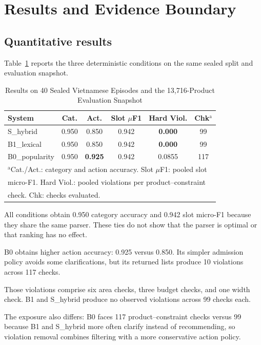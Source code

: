 \documentclass[conference,a4paper]{IEEEtran}
\begin{document}
\section{Results and Evidence Boundary}
\subsection{Quantitative results}
Table~\ref{tab1} reports the three deterministic conditions on the same sealed split and evaluation snapshot.

\begin{table}[htbp]
\caption{Results on 40 Sealed Vietnamese Episodes and the 13{,}716-Product Evaluation Snapshot}
\begin{center}
\footnotesize
\setlength{\tabcolsep}{4pt}
\begin{tabular}{|l|c|c|c|c|c|}
\hline
\textbf{System}&\textbf{Cat.}&\textbf{Act.}&\textbf{Slot $\mu$F1}&\textbf{Hard Viol.}&\textbf{Chk}$^{\mathrm{a}}$ \\
\hline
S\_hybrid& 0.950& 0.850& 0.942& \textbf{0.000}& 99 \\
\hline
B1\_lexical& 0.950& 0.850& 0.942& \textbf{0.000}& 99 \\
\hline
B0\_popularity& 0.950& \textbf{0.925}& 0.942& 0.0855& 117 \\
\hline
\multicolumn{6}{l}{$^{\mathrm{a}}$Cat./Act.: category and action accuracy. Slot $\mu$F1: pooled slot} \\
\multicolumn{6}{l}{micro-F1. Hard Viol.: pooled violations per product--constraint} \\
\multicolumn{6}{l}{check. Chk: checks evaluated.}
\end{tabular}
\label{tab1}
\end{center}
\end{table}

All conditions obtain 0.950 category accuracy and 0.942 slot micro-F1 because they share the same parser. These ties do not show that the parser is optimal or that ranking has no effect.

B0 obtains higher action accuracy: 0.925 versus 0.850. Its simpler admission policy avoids some clarifications, but its returned lists produce 10 violations across 117 checks.

Those violations comprise six area checks, three budget checks, and one width check. B1 and S\_hybrid produce no observed violations across 99 checks each.

The exposure also differs: B0 faces 117 product--constraint checks versus 99 because B1 and S\_hybrid more often clarify instead of recommending, so violation removal combines filtering with a more conservative action policy.
\end{document}
